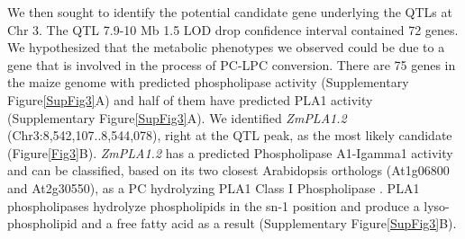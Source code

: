 \documentclass[9pt,twocolumn,twoside,lineno]{BioRxiv}
\begin{document}
We then sought to identify the potential candidate gene underlying the QTLs at Chr 3.
The QTL 7.9-10 Mb 1.5 LOD drop confidence interval contained 72 genes. 
We hypothesized that the metabolic phenotypes we observed could be due to a gene that is involved in the process of PC-LPC conversion.  
There are 75 genes in the maize genome with predicted phospholipase activity (Supplementary Figure\ref{SupFig3}A) and half of them have predicted PLA1 activity (Supplementary Figure\ref{SupFig3}A).  
We identified \textit{ZmPLA1.2} (Chr3:8,542,107..8,544,078), right at the QTL peak, as the most likely candidate (Figure\ref{Fig3}B). 
\textit{ZmPLA1.2} has a predicted Phospholipase A1-Igamma1 activity and can be classified, based on its two closest Arabidopsis orthologs (At1g06800 and At2g30550), as a PC hydrolyzing PLA1 Class I Phospholipase \cite{Ryu2004-iv}. 
PLA1 phospholipases hydrolyze phospholipids in the sn-1 position and produce a lyso-phospholipid and a free fatty acid as a result (Supplementary Figure\ref{SupFig3}B). 
\end{document}
